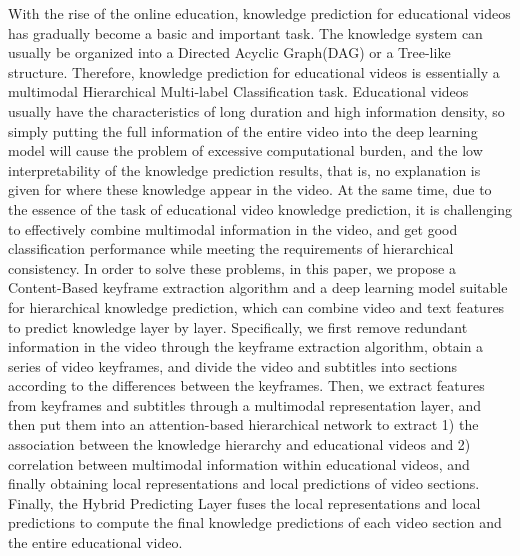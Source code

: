 \begin{abstract*}
    With the rise of the online education, knowledge prediction for educational videos has gradually become a basic and important task.
    The knowledge system can usually be organized into a Directed Acyclic Graph(DAG) or a Tree-like structure.
    Therefore, knowledge prediction for educational videos is essentially a multimodal Hierarchical Multi-label Classification task.
    Educational videos usually have the characteristics of long duration and high information density,
    so simply putting the full information of the entire video into the deep learning model will cause the problem of excessive computational burden,
    and the low interpretability of the knowledge prediction results,
    that is, no explanation is given for where these knowledge appear in the video.
    At the same time, due to the essence of the task of educational video knowledge prediction,
    it is challenging to effectively combine multimodal information in the video, and get good classification performance while meeting the requirements of hierarchical consistency.
    In order to solve these problems, in this paper, we propose a Content-Based keyframe extraction algorithm and a deep learning model suitable for hierarchical knowledge prediction,
    which can combine video and text features to predict knowledge layer by layer.
    Specifically, we first remove redundant information in the video through the keyframe extraction algorithm,
    obtain a series of video keyframes, and divide the video and subtitles into sections according to the differences between the keyframes.
    Then, we extract features from keyframes and subtitles through a multimodal representation layer, and then put them into an attention-based hierarchical network to extract
    1) the association between the knowledge hierarchy and educational videos and
    2) correlation between multimodal information within educational videos,
    and finally obtaining local representations and local predictions of video sections.
    Finally, the Hybrid Predicting Layer fuses the local representations and local predictions to compute the final knowledge predictions of each video section and the entire educational video.
\end{abstract*}
